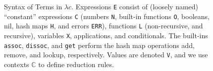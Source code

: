 \begin{figure}
\caption{Syntax of Terms in $\lambda c$.
  Expressions \texttt{E} consist of (loosely named) ``constant'' expressions \texttt{C}
  (numbers \texttt{N}, built-in functions \texttt{O}, booleans, nil, hash maps \texttt{H}, and errors
\texttt{ERR}), 
  functions \texttt{L} (non-recursive, and recursive), variables \texttt{X}, applications,
  and conditionals.
  The built-ins \texttt{assoc}, \texttt{dissoc}, and \texttt{get} perform the
  hash map operations add, remove, and lookup, respectively.
  Values are denoted \texttt{V}, and we use contexts $\mathbb{C}$ to define reduction rules.
  }
  \label{clojure-grammar}
\end{figure}

%

